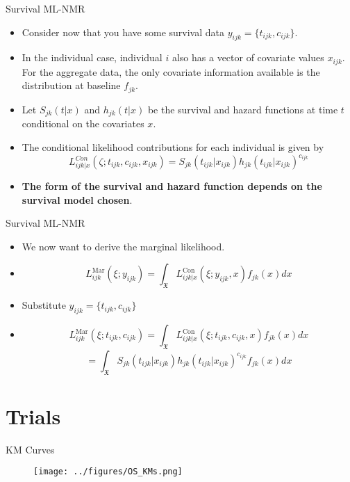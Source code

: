 \documentclass{beamer}
\begin{document}
\begin{frame}{Survival ML-NMR}
    \begin{itemize}
        \item Consider now that you have some survival data $y_{ijk} = \{t_{ijk}, c_{ijk}\}$. 
        \pause
        \item In the individual case, individual $i$ also has a vector of covariate values $x_{ijk}$. For the aggregate data, the only covariate information available is the distribution at baseline $f_{jk}$. 
        \pause 
        \item Let $S_{jk}(t|x)$ and $h_{jk}(t|x)$ be the survival and hazard functions at time $t$ conditional on the covariates $x$. 
        \pause
        \item The conditional likelihood contributions for each individual is given by
        \[L_{ijk|x}^{Con}(\zeta;t_{ijk},c_{ijk},x_{ijk}) = S_{jk}(t_{ijk}| x_{ijk})h_{jk}(t_{ijk}|x_{ijk})^{c_{ijk}}\]
        \pause 
        \item \textbf{The form of the survival and hazard function depends on the survival model chosen}.
    \end{itemize}
\end{frame}

\begin{frame}{Survival ML-NMR}
    \begin{itemize}
        \item We now want to derive the marginal likelihood.
        \pause
        \item \[L_{ijk}^{\text{Mar}}(\xi; y_{ijk}) = \int_{\mathfrak{X}} L_{ijk|x}^{\text{Con}}(\xi; y_{ijk}, x)f_{jk}(x)dx\]
        \pause
        \item Substitute $y_{ijk} = \{t_{ijk}, c_{ijk}\}$
        \pause 
        \item \[L_{ijk}^{\text{Mar}}(\xi; t_{ijk}, c_{ijk}) = \int_{\mathfrak{X}} L_{ijk|x}^{\text{Con}}(\xi; t_{ijk}, c_{ijk}, x)f_{jk}(x)dx\]
                                          \[ = \int_{\mathfrak{X}} S_{jk}(t_{ijk}| x_{ijk})h_{jk}(t_{ijk}|x_{ijk})^{c_{ijk}} f_{jk}(x)dx\]
    \end{itemize}
\end{frame}

\section{Trials}

\begin{frame}{KM Curves}
    \begin{figure}
        \texttt{[image: ../figures/OS\_KMs.png]}
    \end{figure}    
\end{frame}
\end{document}
